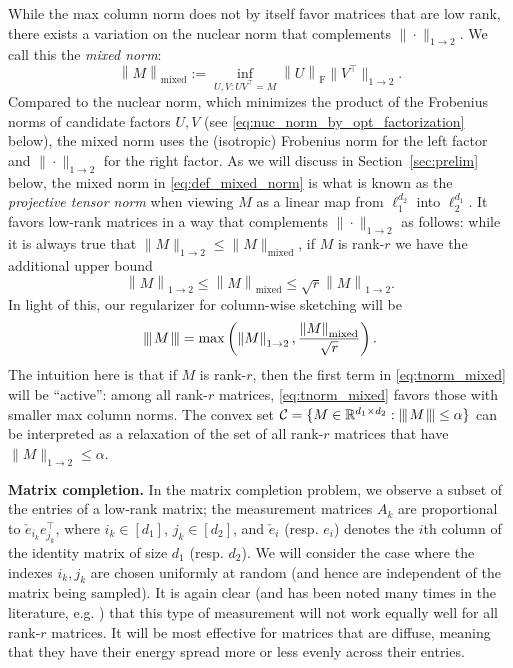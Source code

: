 \documentclass[11pt]{article}
\newcommand{\xspace}{\hbox{\kern-2.5pt}}
\newcommand\tnorm[1]{\left\vert\xspace\left\vert\xspace\left\vert\mskip2mu
#1\mskip2mu \right\vert\xspace\right\vert\xspace\right\vert}
\newcommand{\norm}[1]{\left \|#1 \right \|}
\begin{document}
While the max column norm does not by itself favor matrices that are low rank, there exists a variation on the nuclear norm that complements $\|\cdot\|_{1\rightarrow 2}$.  We call this the \emph{mixed norm}:
\begin{equation}
	\label{eq:def_mixed_norm}
	\norm{M}_\mathrm{mixed} := \inf_{U,V : U V^\top = M} \norm{U}_\mathrm{F} \|V^\top\|_{1\to 2}. 
\end{equation}
Compared to the nuclear norm, which minimizes the product of the Frobenius norms of candidate factors $U,V$ (see \eqref{eq:nuc_norm_by_opt_factorization} below), the mixed norm uses the (isotropic) Frobenius norm for the left factor and $\|\cdot\|_{1\rightarrow2}$ for the right factor. 
As we will discuss in Section~\ref{sec:prelim} below, the mixed norm in \eqref{eq:def_mixed_norm} is what is known as the \emph{projective tensor norm} when viewing $M$ as a linear map from $\ell_1^{d_2}$ into $\ell_2^{d_1}$.  It favors low-rank matrices in a way that complements $\|\cdot\|_{1\rightarrow 2}$ as follows: while it is always true that $\|M\|_{1\rightarrow 2}\leq \|M\|_\mathrm{mixed}$, if $M$ is rank-$r$ we have the additional upper bound
\[
\norm{M}_{1 \to 2} \leq \norm{M}_\mathrm{mixed} \leq \sqrt{r} \norm{M}_{1\to 2}.
\]
In light of this, our regularizer for column-wise sketching will be
\begin{equation}
	\label{eq:tnorm_mixed}
	\tnorm{M} = \max\left( \norm{M}_{1\to 2}, \frac{\norm{M}_\mathrm{mixed}}{\sqrt{r}} \right).
\end{equation}
The intuition here is that if $M$ is rank-$r$, then the first term in \eqref{eq:tnorm_mixed} will be ``active'': among all rank-$r$ matrices, \eqref{eq:tnorm_mixed} favors those with smaller max column norms.  The convex set $\mathcal{C} = \{M \in \mathbb{R}^{d_1 \times d_2} : \tnorm{M} \leq \alpha\}$ can be interpreted as a relaxation of the set of all rank-$r$ matrices that have $\|M\|_{1\rightarrow 2}\leq \alpha$.

\vspace{.1in}
\noindent
\textbf{Matrix completion.}
In the matrix completion problem, we observe a subset of the entries of a low-rank matrix; the measurement matrices  $A_k$ are proportional to $\check{e}_{i_k} e_{j_k}^\top$, where $i_k \in [d_1]$, $j_k \in [d_2]$, and $\check{e}_i$ (resp. $e_i$) denotes the $i$th column of the identity matrix of size $d_1$ (resp. $d_2$).  We will consider the case where the indexes $i_k,j_k$ are chosen uniformly at random (and hence are independent of the matrix being sampled).  
%
It is again clear (and has been noted many times in the literature, e.g. \citep{candes2012exact}) that this type of measurement will not work equally well for all rank-$r$ matrices.  It will be most effective for matrices that are diffuse, meaning that they have their energy spread more or less evenly across their entries.
\end{document}
